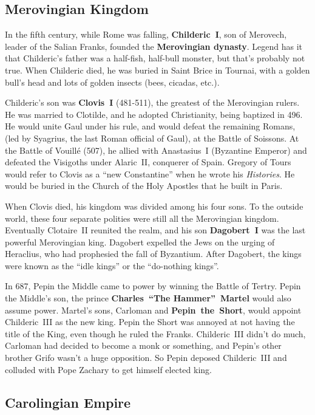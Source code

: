 \subsection*{Merovingian Kingdom}

In the fifth century, while Rome was falling,
\textbf{Childeric~I}, son of Merovech, leader of the Salian Franks, founded the \textbf{Merovingian dynasty}.
Legend has it that Childeric's father was a half-fish, half-bull monster, but that's probably not true.
When Childeric died, he was buried in Saint Brice in Tournai,
with a golden bull's head and lots of golden insects (bees, cicadas, etc.).

Childeric's son was \textbf{Clovis~I} (481-511), the greatest of the Merovingian rulers.
He was married to Clotilde, and he adopted Christianity, being baptized in 496.
He would unite Gaul under his rule, and would defeat the remaining Romans,
(led by Syagrius, the last Roman official of Gaul), at the Battle of Soissons.
At the Battle of Vouill\'e (507), he allied with Anastasius~I (Byzantine Emperor)
and defeated the Visigoths under Alaric~II, conquerer of Spain.
Gregory of Tours would refer to Clovis as a ``new Constantine'' when he wrote his \textit{Histories}.
He would be buried in the Church of the Holy Apostles that he built in Paris.

When Clovis died, his kingdom was divided among his four sons.
To the outside world, these four separate polities were still all the Merovingian kingdom.
Eventually Clotaire~II reunited the realm, and his son \textbf{Dagobert~I} was the last powerful Merovingian king.
Dagobert expelled the Jews on the urging of Heraclius, who had prophesied the fall of Byzantium.
After Dagobert, the kings were known as the ``idle kings'' or the ``do-nothing kings''.

In 687, Pepin the Middle came to power by winning the Battle of Tertry.
Pepin the Middle's son, the prince \textbf{Charles~``The Hammer''~Martel} would also assume power.
Martel's sons, Carloman and \textbf{Pepin~the~Short}, would appoint Childeric~III as the new king.
Pepin the Short was annoyed at not having the title of the King, even though he ruled the Franks.
Childeric~III didn't do much, Carloman had decided to become a monk or something,
and Pepin's other brother Grifo wasn't a huge opposition.
So Pepin deposed Childeric~III and colluded with Pope Zachary to get himself elected king.

\subsection*{Carolingian Empire}

